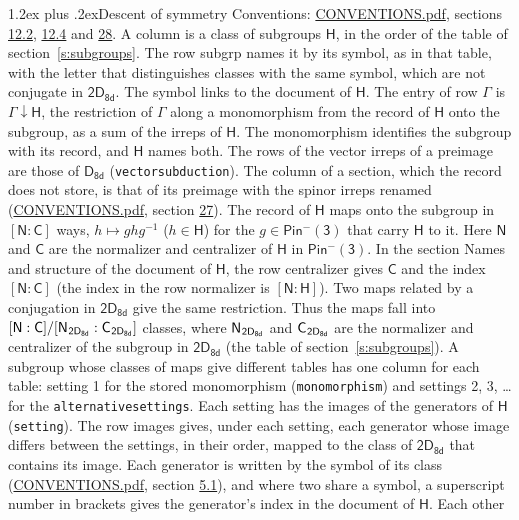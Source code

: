 \documentclass[10pt,a4paper]{article}
\makeatletter
\renewcommand\section{\@startsection{section}{1}{\z@}{-3ex plus -1ex minus -.2ex}%
  {1.2ex plus .2ex}{\normalfont\large\sffamily\bfseries\color{parttitle}}}
\numberwithin{equation}{section}
\newcommand{\grp}[1]{\mathsf{#1}}
\newcommand{\grpindex}[2]{[#1 : #2]}
\newcommand{\restr}[2]{#1\!\downarrow#2}
\newcommand{\hairsp}{\mkern1mu}
\makeatother
\begin{document}
\section{Descent of symmetry}\label{s:subduction}
Conventions: \href{../../CONVENTIONS.pdf}{CONVENTIONS.pdf}, sections \href{../../../rotation/CONVENTIONS.pdf\#conv.12.2}{12.2}, \href{../../../rotation/CONVENTIONS.pdf\#conv.12.4}{12.4} and \href{../../CONVENTIONS.pdf\#conv.28}{28}.
A column is a class of subgroups $\grp{H}$, in the order of the table of section~\ref{s:subgroups}. The row subgrp names it by its symbol, as in that table, with the letter that distinguishes classes with the same symbol, which are not conjugate in $\grp{2D_{8d}}$. The symbol links to the document of $\grp{H}$. The entry of row $\Gamma$ is $\restr{\Gamma}{\grp{H}}$, the restriction of $\Gamma$ along a monomorphism from the record of $\grp{H}$ onto the subgroup, as a sum of the irreps of $\grp{H}$. The monomorphism identifies the subgroup with its record, and $\grp{H}$ names both. The rows of the vector irreps of a preimage are those of \href{../../../rotation/data/pdf/D8d.pdf}{$\grp{D_{8d}}$} (\texttt{vectorsubduction}). The column of a section, which the record does not store, is that of its preimage with the spinor irreps renamed (\href{../../CONVENTIONS.pdf}{CONVENTIONS.pdf}, section \href{../../CONVENTIONS.pdf\#conv.27}{27}). \label{n:group.normalizer.o3}\label{n:group.centralizer.o3}\label{n:element.h}The record of $\grp{H}$ maps onto the subgroup in $\grpindex{\grp{N}}{\grp{C}}$ ways, $h \mapsto g h g^{-1}$ ($h \in \grp{H}$) for the $g \in \grp{Pin^{-}(3)}$ that carry $\grp{H}$ to it. Here $\grp{N}$ and $\grp{C}$ are the normalizer and centralizer of $\grp{H}$ in \href{Pinminus3.pdf}{$\grp{Pin^{-}(3)}$}. In the section Names and structure of the document of $\grp{H}$, the row centralizer gives $\grp{C}$ and the index $\grpindex{\grp{N}}{\grp{C}}$ (the index in the row normalizer is $\grpindex{\grp{N}}{\grp{H}}$). Two maps related by a conjugation in $\grp{2D_{8d}}$ give the same restriction. Thus the maps fall into $\grpindex{\grp{N}}{\grp{C}}/\grpindex{\grp{N}_{\hairsp \grp{2D_{8d}}}}{\grp{C}_{\hairsp \grp{2D_{8d}}}}$ classes, where $\grp{N}_{\hairsp \grp{2D_{8d}}}$ and $\grp{C}_{\hairsp \grp{2D_{8d}}}$ are the normalizer and centralizer of the subgroup in $\grp{2D_{8d}}$ (the table of section~\ref{s:subgroups}). \label{n:head.setting}A subgroup whose classes of maps give different tables has one column for each table: setting 1 for the stored monomorphism (\texttt{monomorphism}) and settings 2, 3, \dots{} for the \texttt{alternativesettings}. Each setting has the images of the generators of $\grp{H}$ (\texttt{setting}). \label{n:head.images}The row images gives, under each setting, each generator whose image differs between the settings, in their order, mapped to the class of $\grp{2D_{8d}}$ that contains its image. \label{n:element.generator.index}Each generator is written by the symbol of its class (\href{../../CONVENTIONS.pdf}{CONVENTIONS.pdf}, section \href{../../../rotation/CONVENTIONS.pdf\#conv.5.1}{5.1}), and where two share a symbol, a superscript number in brackets gives the generator's index in the document of $\grp{H}$. \label{n:irrep.Delta}Each other 
\end{document}
